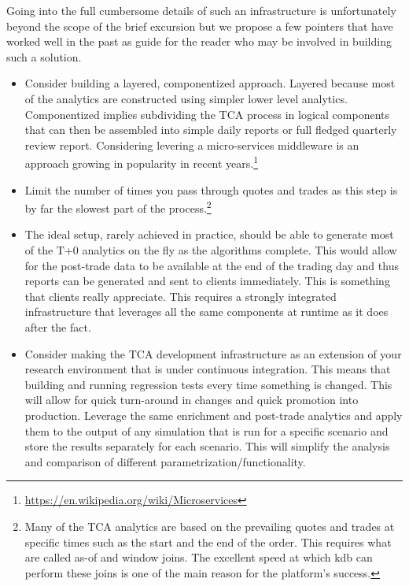 Going into the full cumbersome details of such an infrastructure is unfortunately beyond the scope of the brief excursion but we propose a few pointers that have worked well in the past as  guide for the reader who may be involved in building such a solution.
\begin{itemize}
\item Consider building a layered, componentized approach. Layered because most of the analytics are constructed using simpler lower level analytics. Componentized implies subdividing the TCA process in logical components that can then be assembled into simple daily reports or full fledged quarterly review report. Considering levering a micro-services middleware is an approach growing in popularity in recent years.\footnote{\url{https://en.wikipedia.org/wiki/Microservices}}

\item Limit the number of times you pass through quotes and trades as this step is by far the slowest part of the process.\footnote{Many of the TCA analytics are based on the prevailing quotes and trades at specific times such as the start and the end of the order. This requires what are called  as-of and window joins. The excellent speed at which kdb can perform these joins is one of the main reason for the platform's success. }

\item The ideal setup, rarely achieved in practice, should be able to generate most of the T+0 analytics on the fly as the algorithms complete. This would allow for the post-trade data to be available at the end of the trading day and thus reports can be generated and sent to clients immediately. This is something that clients really appreciate. This requires a strongly integrated infrastructure that leverages all the same components at runtime as it does after the fact. 

\item Consider making the TCA development infrastructure as an extension of your research environment that is under continuous integration. This means that building and running regression tests every time something is changed. This will allow for quick turn-around in changes and quick promotion into production. Leverage the same enrichment and post-trade analytics and apply them to the output of any simulation that is run for a specific scenario and store the results separately for each scenario. This will simplify the analysis and comparison of different  parametrization/functionality.


\end{itemize}
